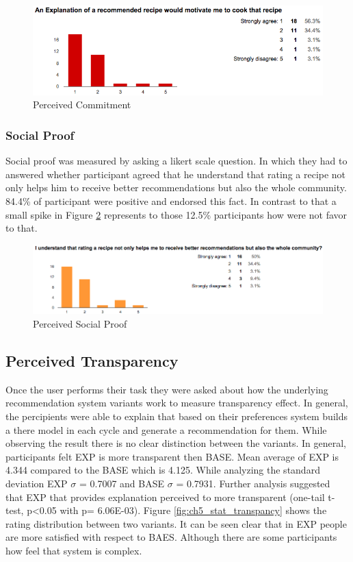 \begin{figure}[h]
	\centering
	\includegraphics[width=1\linewidth]{figures/ch5_stat_commitment}
	\caption{Perceived Commitment}
	\label{fig:ch5_commitment}
\end{figure}

\subsubsection{Social Proof}

Social proof was measured by asking a likert scale question. In which they had to answered whether participant agreed that he understand that rating a recipe not only helps him to receive better recommendations but also the whole community. 84.4\% of participant were positive and endorsed this fact. In contrast to that a small spike in Figure \ref{fig:ch5_stat_social_proof} represents to those 12.5\% participants how were not favor to that. 

\begin{figure}[h]
\centering
\includegraphics[width=1\linewidth]{figures/ch5_stat_social_proof.png}
\caption{Perceived Social Proof}
\label{fig:ch5_stat_social_proof}
\end{figure}

\subsection{Perceived Transparency}

Once the user performs their task they were asked about how the underlying recommendation system variants work to measure transparency effect. In general, the percipients were able to explain that based on their preferences system builds a there model in each cycle and generate a recommendation for them.  While observing the result there is no clear distinction between the variants. In general, participants felt EXP is more transparent then BASE.  Mean average of EXP is 4.344 compared to the BASE which is 4.125. While analyzing the standard deviation EXP ${\sigma}$ = 0.7007 and BASE ${\sigma}$ = 0.7931. Further analysis suggested that EXP that provides explanation perceived to more transparent (one-tail t-test, p<0.05 with p= 6.06E-03). Figure \ref{fig:ch5_stat_transpancy} shows the rating distribution between two variants. It can be seen clear that in EXP people are more satisfied with respect to BAES. Although there are some participants how feel that system is complex.

